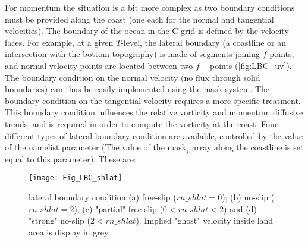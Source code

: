 \documentclass[../tex_main/NEMO_manual]{subfiles}
\begin{document}
For momentum the situation is a bit more complex as two boundary conditions must be provided along the coast
(one each for the normal and tangential velocities).
The boundary of the ocean in the C-grid is defined by the velocity-faces.
For example, at a given $T$-level,
the lateral boundary (a coastline or an intersection with the bottom topography) is made of
segments joining $f$-points, and normal velocity points are located between two $f-$points (\autoref{fig:LBC_uv}).
The boundary condition on the normal velocity (no flux through solid boundaries)
can thus be easily implemented using the mask system.
The boundary condition on the tangential velocity requires a more specific treatment.
This boundary condition influences the relative vorticity and momentum diffusive trends,
and is required in order to compute the vorticity at the coast.
Four different types of lateral boundary condition are available,
controlled by the value of the  namelist parameter
(The value of the mask$_{f}$ array along the coastline is set equal to this parameter).
These are:

\begin{figure}[!p] \begin{center}
\texttt{[image: Fig\_LBC\_shlat]}
\caption{     \protect\label{fig:LBC_shlat} 
  lateral boundary condition
  (a) free-slip ($rn\_shlat=0$);
  (b) no-slip ($rn\_shlat=2$);
  (c) "partial" free-slip ($0<rn\_shlat<2$) and
  (d) "strong" no-slip ($2<rn\_shlat$).
  Implied "ghost" velocity inside land area is display in grey. }
\end{center}    \end{figure}
\end{document}

